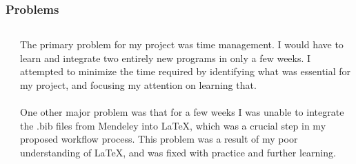 \documentclass[aspectratio = 169]{beamer}
\begin{document}
\begin{frame}
\label{problems}
\frametitle{Problems}
\begin{columns}


\hyperlink{introI}{} \newline
\hyperlink{introII}{} \newline 
\hyperlink{scoping}{} \newline
\hyperlink{elaboration}{} \newline  
\hyperlink{software}{} \newline 
\hyperlink{toolchain}{} \newline 
\hyperlink{learning}{} \newline 
\hyperlink{problems}{} \newline 
\hyperlink{results}{} \newline
\hyperlink{exampleI}{} \newline 
\hyperlink{exampleII}{}  



The primary problem for my project was time management. I would have to learn and integrate two entirely new programs in only a few weeks. I attempted to minimize the time required by identifying what was essential for my project, and focusing my attention on learning that.
\\~\\
One other major problem was that for a few weeks I was unable to integrate the .bib files from Mendeley into LaTeX, which was a crucial step in my proposed workflow process. This problem was a result of my poor understanding of LaTeX, and was fixed with practice and further learning.

\end{columns}
\end{frame}



\end{document}
